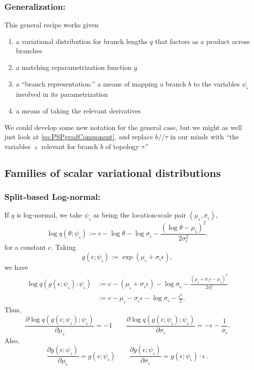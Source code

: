\documentclass{article}
\newcommand{\psp}{\slash\!\!\slash}
\begin{document}
\subsubsection*{Generalization:}
This general recipe works given
\begin{enumerate}
    \item a variational distribution for branch lengths $q$ that factors as a product across branches
    \item a matching reparametrization function $g$
    \item a ``branch representation:'' a means of mapping a branch $b$ to the variables $\psi_\varsigma$ involved in its parametrization
    \item a means of taking the relevant derivatives
\end{enumerate}

We could develop some new notation for the general case, but we might as well just look at \eqref{eq:PSPgradComponent}, and replace $b \psp \tau$ in our minds with ``the variables $\varsigma$ relevant for branch $b$ of topology $\tau$.''


\subsection*{Families of scalar variational distributions}
\subsubsection*{Split-based Log-normal:}
If $q$ is log-normal, we take $\psi_\varsigma$ as being the location-scale pair $(\mu_\varsigma, \sigma_\varsigma)$,
\[
\log q(\theta; \psi_\varsigma) := c - \log \theta - \log \sigma_\varsigma - \frac{(\log \theta - \mu_\varsigma)^2}{2 \sigma_\varsigma^2}.
\]
for a constant $c$.
Taking
\begin{equation}
g(\epsilon; \psi_\varsigma) := \exp(\mu_\varsigma + \sigma_\varsigma \epsilon),
\label{eq:gLogNorm}
\end{equation}
we have
\begin{align*}
\log q(g(\epsilon; \psi_\varsigma); \psi_\varsigma)
& := c - (\mu_\varsigma + \sigma_\varsigma \epsilon)
    - \log \sigma_\varsigma
    - \frac{(\mu_\varsigma + \sigma_\varsigma \epsilon - \mu_\varsigma)^2}{2 \sigma_\varsigma^2} \\
& := c - \mu_\varsigma - \sigma_\varsigma \epsilon - \log \sigma_\varsigma - \frac{\epsilon^2}{2}.
\end{align*}
Thus,
\begin{equation}
    \frac{\partial \log q(g(\epsilon; \psi_\varsigma); \psi_\varsigma)}{\partial \mu_\varsigma} = -1
    \qquad
    \frac{\partial \log q(g(\epsilon; \psi_\varsigma); \psi_\varsigma)}{\partial \sigma_\varsigma} = -\epsilon - \frac{1}{\sigma_\varsigma}.
    \label{eq:dlogqgdPsi}
\end{equation}
Also,
\begin{equation}
    \frac{\partial g(\epsilon; \psi_\varsigma)}{\partial \mu_\varsigma} = g(\epsilon; \psi_\varsigma)
    \qquad
    \frac{\partial g(\epsilon; \psi_\varsigma)}{\partial \sigma_\varsigma} = g(\epsilon; \psi_\varsigma) \cdot \epsilon \, .
    \label{eq:dgdPsi}
\end{equation}
\end{document}
